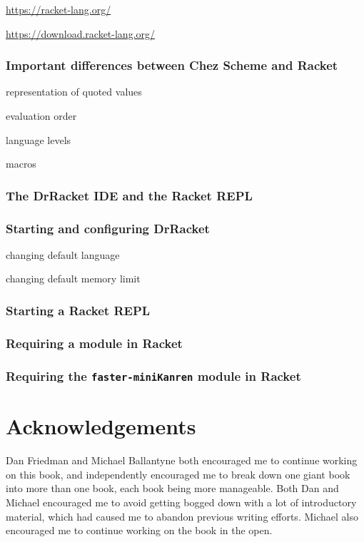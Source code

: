 \documentclass{book}
\begin{document}
\url{https://racket-lang.org/}

\url{https://download.racket-lang.org/}

\subsubsection{Important differences between Chez Scheme and Racket}

representation of quoted values

evaluation order

language levels

macros

\subsubsection{The DrRacket IDE and the Racket REPL}

\subsubsection{Starting and configuring DrRacket}

changing default language

changing default memory limit

\subsubsection{Starting a Racket REPL}

\subsubsection{Requiring a module in Racket}

\subsubsection{Requiring the \texttt{faster-miniKanren} module in Racket}

\section{Acknowledgements}

Dan Friedman and Michael Ballantyne both encouraged me to continue working on this book, and independently encouraged me to break down one giant book into more than one book, each book being more manageable.
%
Both Dan and Michael encouraged me to avoid getting bogged down with a lot of introductory material, which had caused me to abandon previous writing efforts.
%
Michael also encouraged me to continue working on the book in the open.
\end{document}
